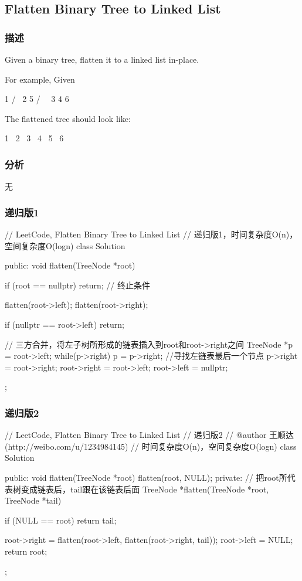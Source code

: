 \subsection{Flatten Binary Tree to Linked List}
\label{sec:flatten-binary-tree-to-linked-list}


\subsubsection{描述}
Given a binary tree, flatten it to a linked list in-place.

For example, Given
\begin{Code}
         1
        / \
       2   5
      / \   \
     3   4   6
\end{Code}

The flattened tree should look like:
\begin{Code}
   1
    \
     2
      \
       3
        \
         4
          \
           5
            \
             6
\end{Code}

\subsubsection{分析}
无


\subsubsection{递归版1}
\begin{Code}
// LeetCode, Flatten Binary Tree to Linked List
// 递归版1，时间复杂度O(n)，空间复杂度O(logn)
class Solution {
public:
    void flatten(TreeNode *root) {
        if (root == nullptr) return;  // 终止条件

        flatten(root->left);
        flatten(root->right);

        if (nullptr == root->left) return;

        // 三方合并，将左子树所形成的链表插入到root和root->right之间
        TreeNode *p = root->left;
        while(p->right) p = p->right; //寻找左链表最后一个节点
        p->right = root->right;
        root->right = root->left;
        root->left = nullptr;
    }
};
\end{Code}


\subsubsection{递归版2}
\begin{Code}
// LeetCode, Flatten Binary Tree to Linked List
// 递归版2
// @author 王顺达(http://weibo.com/u/1234984145)
// 时间复杂度O(n)，空间复杂度O(logn)
class Solution {
public:
    void flatten(TreeNode *root) {
        flatten(root, NULL);
    }
private:
    // 把root所代表树变成链表后，tail跟在该链表后面
    TreeNode *flatten(TreeNode *root, TreeNode *tail) {
        if (NULL == root) return tail;

        root->right = flatten(root->left, flatten(root->right, tail));
        root->left = NULL;
        return root;
    }
};
\end{Code}



